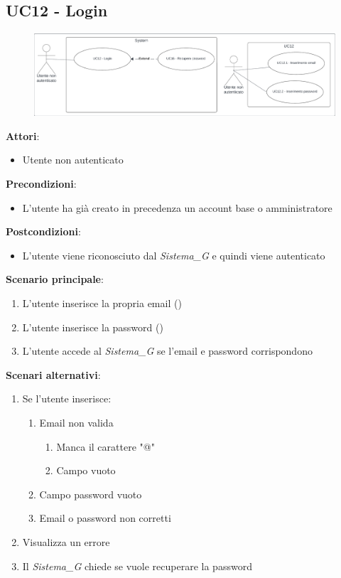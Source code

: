 \subsection{UC12 - Login} \label{usecase:12}
\begin{figure}[H]
    \centering
    \includegraphics[width=0.9\linewidth]{ucd/ucd12.png}
\end{figure}
\textbf{Attori}:
\begin{itemize}
    \item Utente non autenticato
\end{itemize}
\textbf{Precondizioni}:
\begin{itemize}
    \item L'utente ha già creato in precedenza un account base o amministratore
\end{itemize}
\textbf{Postcondizioni}:
\begin{itemize}
    \item L'utente viene riconosciuto dal \textit{Sistema_G} e quindi viene autenticato
\end{itemize}
\textbf{Scenario principale}:
\begin{enumerate}
    \item L'utente inserisce la propria email ()
    \item L'utente inserisce la password ()
    \item L'utente accede al \textit{Sistema_G} se l'email e password corrispondono
\end{enumerate}
\textbf{Scenari alternativi}:
\begin{enumerate}
    \item Se l'utente inserisce:
    \begin{enumerate}
        \item Email non valida
        \begin{enumerate}
            \item Manca il carattere "@"
            \item Campo vuoto
        \end{enumerate}
        \item Campo password vuoto
        \item Email o password non corretti
    \end{enumerate}
    \item Visualizza un errore
    \item Il \textit{Sistema_G} chiede se vuole recuperare la password
\end{enumerate}